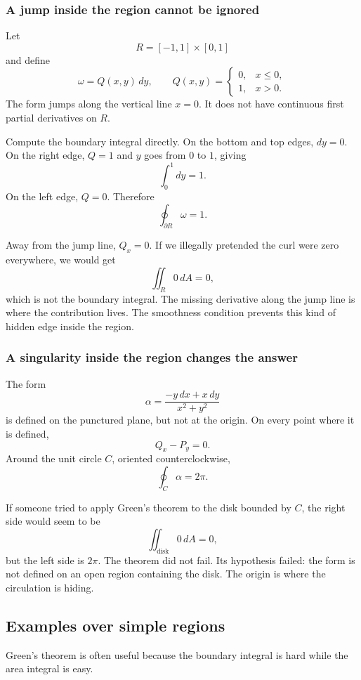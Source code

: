 \subsubsection*{A jump inside the region cannot be ignored}

Let
\[
    R=[-1,1]\times[0,1]
\]
and define
\[
    \omega=Q(x,y)\,dy,
    \qquad
    Q(x,y)=
    \begin{cases}
    0, & x\le0,\\
    1, & x>0.
    \end{cases}
\]
The form jumps along the vertical line \(x=0\).  It does not have continuous first
partial derivatives on \(R\).

Compute the boundary integral directly.  On the bottom and top edges, \(dy=0\).  On
the right edge, \(Q=1\) and \(y\) goes from \(0\) to \(1\), giving
\[
    \int_0^1 dy=1.
\]
On the left edge, \(Q=0\).  Therefore
\[
\boxed{
    \oint_{\partial R}\omega=1.
}
\]

Away from the jump line, \(Q_x=0\).  If we illegally pretended the curl were zero
everywhere, we would get
\[
    \iint_R 0\,dA=0,
\]
which is not the boundary integral.  The missing derivative along the jump line is
where the contribution lives.  The smoothness condition prevents this kind of hidden
edge inside the region.

\subsubsection*{A singularity inside the region changes the answer}

The form
\[
    \alpha=\frac{-y\,dx+x\,dy}{x^2+y^2}
\]
is defined on the punctured plane, but not at the origin.  On every point where it is
defined,
\[
    Q_x-P_y=0.
\]
Around the unit circle \(C\), oriented counterclockwise,
\[
    \oint_C \alpha=2\pi.
\]

If someone tried to apply Green's theorem to the disk bounded by \(C\), the right side
would seem to be
\[
    \iint_{\text{disk}}0\,dA=0,
\]
but the left side is \(2\pi\).  The theorem did not fail.  Its hypothesis failed: the form
is not defined on an open region containing the disk.  The origin is where the
circulation is hiding.

\subsection{Examples over simple regions}

Green's theorem is often useful because the boundary integral is hard while the area
integral is easy.

